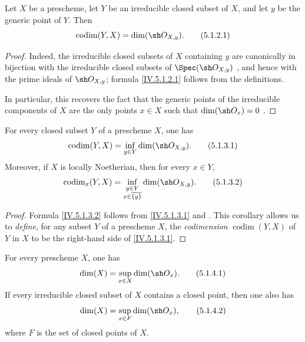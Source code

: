 \begin{proposition}[5.1.2]
\label{IV.5.1.2}
Let $X$ be a prescheme, let $Y$ be an irreducible closed subset of
$X$, and let $y$ be the generic point of $Y$. Then
\begin{equation}
\operatorname{codim}(Y,X)=\dim(\sh O_{X,y}).
\tag{5.1.2.1}\label{IV.5.1.2.1}
\end{equation}
\end{proposition}

\begin{proof}
Indeed, the irreducible closed subsets of $X$ containing $y$ are
canonically in bijection with the irreducible closed subsets of
$\Spec(\sh O_{X,y})$ , and hence with the prime
ideals of $\sh O_{X,y}$; formula \eqref{IV.5.1.2.1} follows from the
definitions.

In particular, this recovers the fact that the generic points of the
irreducible components of $X$ are the only points $x\in X$ such that
$\dim(\sh O_x)=0$ .
\end{proof}


\begin{corollary}[5.1.3]
\label{IV.5.1.3}
For every closed subset $Y$ of a prescheme $X$, one has
\begin{equation}
\operatorname{codim}(Y,X)=\inf_{y\in Y}\dim(\sh O_{X,y}).
\tag{5.1.3.1}\label{IV.5.1.3.1}
\end{equation}
Moreover, if $X$ is locally Noetherian, then for every $x\in Y$,
\begin{equation}
\operatorname{codim}_x(Y,X)
=\inf_{\substack{y\in Y\\x\in\overline{\{y\}}}}
  \dim(\sh O_{X,y}).
\tag{5.1.3.2}\label{IV.5.1.3.2}
\end{equation}
\end{corollary}

\begin{proof}
Formula \eqref{IV.5.1.3.2} follows from
\eqref{IV.5.1.3.1} and .
This corollary allows us to \emph{define}, for any subset $Y$ of a
prescheme $X$, the \emph{codimension}
$\operatorname{codim}(Y,X)$ of $Y$ in $X$ to be the right-hand side
of \eqref{IV.5.1.3.1}.
\end{proof}

\begin{proposition}[5.1.4]
\label{IV.5.1.4}
For every prescheme $X$, one has
\begin{equation}
\dim(X)=\sup_{x\in X}\dim(\sh O_x).
\tag{5.1.4.1}\label{IV.5.1.4.1}
\end{equation}
If every irreducible closed subset of $X$ contains a closed point,
then one also has
\begin{equation}
\dim(X)=\sup_{x\in F}\dim(\sh O_x),
\tag{5.1.4.2}\label{IV.5.1.4.2}
\end{equation}
where $F$ is the set of closed points of $X$.
\end{proposition}

